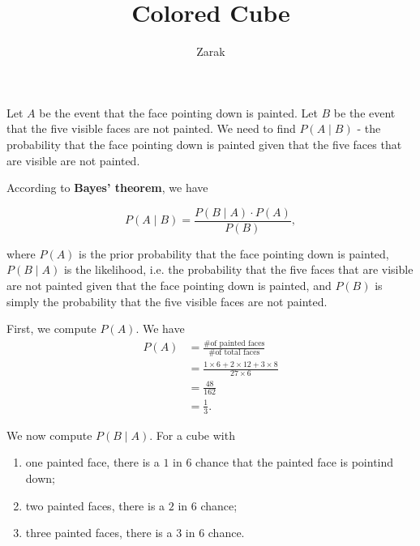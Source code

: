\documentclass{article}
\title{Colored Cube}
\author{Zarak}
\theoremstyle{mytheoremstyle}
\theoremstyle{mytheoremstyle}
\theoremstyle{myproblemstyle}
\begin{document}
    \maketitle

    Let \( A \) be the event that the face pointing down is painted. Let \( B
    \) be the event that the five visible faces are not painted. We need to
    find \( P(A \mid B) \) - the probability that the face pointing down is
    painted given that the five faces that are visible are not painted.

    According to \textbf{Bayes' theorem}, we have

    \begin{definition}
      
      \begin{displaymath}
      P(A \mid B) = \frac{P(B \mid A) \cdot P(A)}{P(B)},
      \end{displaymath}
      
    \end{definition}
    

    where \( P(A) \) is the prior probability that the face pointing down is
    painted, \( P(B \mid A) \) is the likelihood, i.e. the probability that the
    five faces that are visible are not painted given that the face pointing
    down is painted, and \( P(B) \) is simply the probability that the five
    visible faces are not painted.

    First, we compute \( P(A) \). We have 
    \begin{align*}
      P(A) &= \frac{\text{\# of painted faces}}{\text{\# of total faces}} \\
           &= \frac{1 \times 6 + 2 \times 12 + 3 \times 8}{27 \times 6} \\
           &= \frac{48}{162} \\
           &= \frac{1}{3}.
    \end{align*}

    We now compute \( P(B \mid A) \). For a cube with 
    \begin{enumerate}
      \item one painted face, there is a \( 1 \) in \( 6 \) chance that the
        painted face is pointind down;
      \item two painted faces, there is a \( 2 \) in \( 6 \) chance;
      \item three painted faces, there is a \( 3 \) in \( 6 \) chance.
    \end{enumerate}
\end{document}
